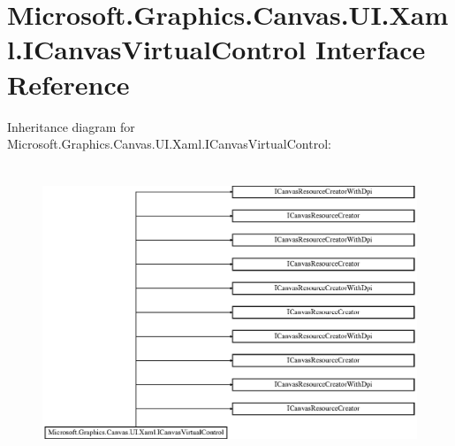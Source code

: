 \hypertarget{interface_microsoft_1_1_graphics_1_1_canvas_1_1_u_i_1_1_xaml_1_1_i_canvas_virtual_control}{}\section{Microsoft.\+Graphics.\+Canvas.\+U\+I.\+Xaml.\+I\+Canvas\+Virtual\+Control Interface Reference}
\label{interface_microsoft_1_1_graphics_1_1_canvas_1_1_u_i_1_1_xaml_1_1_i_canvas_virtual_control}
Inheritance diagram for Microsoft.\+Graphics.\+Canvas.\+U\+I.\+Xaml.\+I\+Canvas\+Virtual\+Control\+:\begin{figure}[H]
\begin{center}
\leavevmode
\includegraphics[height=8.800000cm]{interface_microsoft_1_1_graphics_1_1_canvas_1_1_u_i_1_1_xaml_1_1_i_canvas_virtual_control}
\end{center}
\end{figure}
